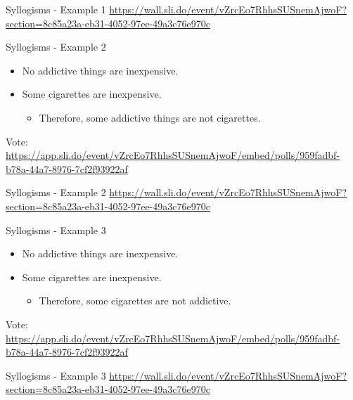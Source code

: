 \documentclass[
  ignorenonframetext,
]{beamer}
\providecommand{\tightlist}{%
  \setlength{\itemsep}{0pt}\setlength{\parskip}{0pt}}\usepackage{longtable,booktabs,array}
\begin{document}
\begin{frame}{Syllogisms - Example 1}
\protect\hypertarget{syllogisms---example-1-1}{}
\url{https://wall.sli.do/event/vZrcEo7RhhsSUSnemAjwoF?section=8c85a23a-eb31-4052-97ee-49a3c76e970c}
\end{frame}

\begin{frame}{Syllogisms - Example 2}
\protect\hypertarget{syllogisms---example-2}{}
\begin{itemize}
\tightlist
\item
  No addictive things are inexpensive.
\item
  Some cigarettes are inexpensive.

  \begin{itemize}
  \tightlist
  \item
    Therefore, some addictive things are not cigarettes.
  \end{itemize}
\end{itemize}

Vote:
\url{https://app.sli.do/event/vZrcEo7RhhsSUSnemAjwoF/embed/polls/959fadbf-b78a-44a7-8976-7cf2f93922af}
\end{frame}

\begin{frame}{Syllogisms - Example 2}
\protect\hypertarget{syllogisms---example-2-1}{}
\url{https://wall.sli.do/event/vZrcEo7RhhsSUSnemAjwoF?section=8c85a23a-eb31-4052-97ee-49a3c76e970c}
\end{frame}

\begin{frame}{Syllogisms - Example 3}
\protect\hypertarget{syllogisms---example-3}{}
\begin{itemize}
\tightlist
\item
  No addictive things are inexpensive.
\item
  Some cigarettes are inexpensive.

  \begin{itemize}
  \tightlist
  \item
    Therefore, some cigarettes are not addictive.
  \end{itemize}
\end{itemize}

Vote:
\url{https://app.sli.do/event/vZrcEo7RhhsSUSnemAjwoF/embed/polls/959fadbf-b78a-44a7-8976-7cf2f93922af}
\end{frame}

\begin{frame}{Syllogisms - Example 3}
\protect\hypertarget{syllogisms---example-3-1}{}
\url{https://wall.sli.do/event/vZrcEo7RhhsSUSnemAjwoF?section=8c85a23a-eb31-4052-97ee-49a3c76e970c}
\end{frame}
\end{document}
